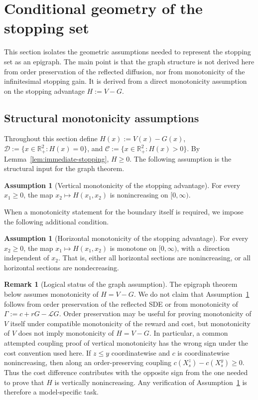 \documentclass[pdflatex,sn-mathphys-num]{sn-jnl}
\theoremstyle{plain}
\theoremstyle{definition}
\newtheorem{assumption}[theorem]{Assumption}
\newtheorem{remark}[theorem]{Remark}
\newcommand{\R}{\mathbb{R}}
\begin{document}
\section{Conditional geometry of the stopping set}
\label{sec:conditional-geometry}
This section isolates the geometric assumptions needed to represent the
stopping set as an epigraph. The main point is that the graph structure is not
derived here from order preservation of the reflected diffusion, nor from
monotonicity of the infinitesimal stopping gain. It is derived from a direct
monotonicity assumption on the stopping advantage $H:=V-G$.

\subsection{Structural monotonicity assumptions}
\label{sec:structural-monotonicity}
Throughout this section define
$   H(x):=V(x)-G(x)$,
$   \mathcal D:=\{x\in\R^2_+:H(x)=0\}$,
and
$   \mathcal C:=\{x\in\R^2_+:H(x)>0\}$.
By Lemma~\ref{lem:immediate-stopping}, $H\ge0$. The following assumption is the
structural input for the graph theorem.

\begin{assumption}[Vertical monotonicity of the stopping advantage]
\label{ass:vertical-H}
For every $x_1\ge0$, the map $x_2\longmapsto H(x_1,x_2)$ is nonincreasing on
$[0,\infty)$.
\end{assumption}

When a monotonicity statement for the boundary itself is required, we impose
the following additional condition.

\begin{assumption}[Horizontal monotonicity of the stopping advantage]
\label{ass:horizontal-H}
For every $x_2\ge0$, the map $x_1\longmapsto H(x_1,x_2)$ is monotone on
$[0,\infty)$, with a direction independent of $x_2$. That is, either all
horizontal sections are nonincreasing, or all horizontal sections are
nondecreasing.
\end{assumption}

\begin{remark}[Logical status of the graph assumption]
\label{rem:graph-assumption-status}
The epigraph theorem below assumes monotonicity of $H=V-G$. We do not claim
that Assumption~\ref{ass:vertical-H} follows from order preservation of the
reflected SDE or from monotonicity of $\Gamma:=c+rG-\mathcal LG$. Order
preservation may be useful for proving monotonicity of $V$ itself under
compatible monotonicity of the reward and cost, but monotonicity of $V$ does
not imply monotonicity of $H=V-G$. In particular, a common attempted coupling
proof of vertical monotonicity has the wrong sign under the cost convention
used here. If $z\le y$ coordinatewise and $c$ is coordinatewise nonincreasing,
then along an order-preserving coupling $c(X_s^z)-c(X_s^y)\ge0$. Thus the cost
difference contributes with the opposite sign from the one needed to prove
that $H$ is vertically nonincreasing. Any verification of
Assumption~\ref{ass:vertical-H} is therefore a model-specific task.
\end{remark}
\end{document}
